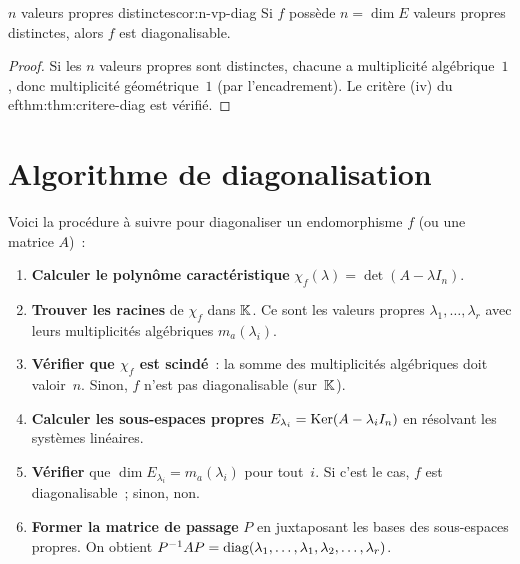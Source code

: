 \begin{corollary}{$n$ valeurs propres distinctes}{cor:n-vp-diag}
  Si $f$ possède $n=\dim E$ valeurs propres distinctes, alors $f$ est
  diagonalisable.
\end{corollary}

\begin{proof}
  Si les $n$ valeurs propres sont distinctes, chacune a multiplicité
  algébrique~$1$, donc multiplicité géométrique~$1$ (par l'encadrement).
  Le critère (iv) du 
ef{thm:thm:critere-diag} est vérifié.
\end{proof}

\section{Algorithme de diagonalisation}\label{sec:algo-diag}

Voici la procédure à suivre pour diagonaliser un endomorphisme $f$
(ou une matrice $A$)~:

\begin{enumerate}[label=\textbf{Étape \arabic*.},leftmargin=3em]
  \item \textbf{Calculer le polynôme caractéristique} $\chi_f(\lambda)
    =\det(A-\lambda I_n)$.
  \item \textbf{Trouver les racines} de $\chi_f$ dans ${\mathbb{K}}$. Ce sont
    les valeurs propres $\lambda_1,\ldots,\lambda_r$ avec leurs
    multiplicités algébriques $m_a(\lambda_i)$.
  \item \textbf{Vérifier que $\chi_f$ est scindé}~: la somme des
    multiplicités algébriques doit valoir~$n$. Sinon, $f$ n'est pas
    diagonalisable (sur~${\mathbb{K}}$).
  \item \textbf{Calculer les sous-espaces propres}
    $E_{\lambda_i}=\operatorname{Ker}(A-\lambda_i I_n)$ en résolvant les systèmes
    linéaires.
  \item \textbf{Vérifier} que $\dim E_{\lambda_i}=m_a(\lambda_i)$ pour
    tout~$i$. Si c'est le cas, $f$ est diagonalisable~; sinon, non.
  \item \textbf{Former la matrice de passage} $P$ en juxtaposant les
    bases des sous-espaces propres. On obtient
    ${P}^{-1}AP=\operatorname{diag}(\lambda_1,\ldots,\lambda_1,\lambda_2,\ldots,
    \lambda_r)$.
\end{enumerate}

